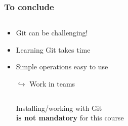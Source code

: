 \documentclass[xcolor=x11names,compress]{beamer}
\renewcommand{\(}{\begin{columns}}
\renewcommand{\)}{\end{columns}}
\newcommand{\<}[1]{\begin{column}{#1}}
\renewcommand{\>}{\end{column}}
\begin{document}
\begin{frame}
\frametitle{To conclude}
\begin{columns}[t]
 \begin{column}{0.5\textwidth}
    \begin{itemize}[<+->]
    \item Git can be challenging!
    \item Learning Git takes time
    \item Simple operations easy to use
    \item[$\hookrightarrow$] Work in teams
   
    \end{itemize}
 \end{column}
 \begin{column}{0.5\textwidth}
    \begin{itemize}
    \item[]
    \end{itemize}
 \end{column}
\end{columns}
 \begin{itemize}[<+->]
 \item[] 
    \item[] 
    \begin{center}
    Installing/working with Git \\
     \textbf{is not mandatory} for this course
    \end{center}
  \end{itemize}   
\end{frame}
\end{document}
